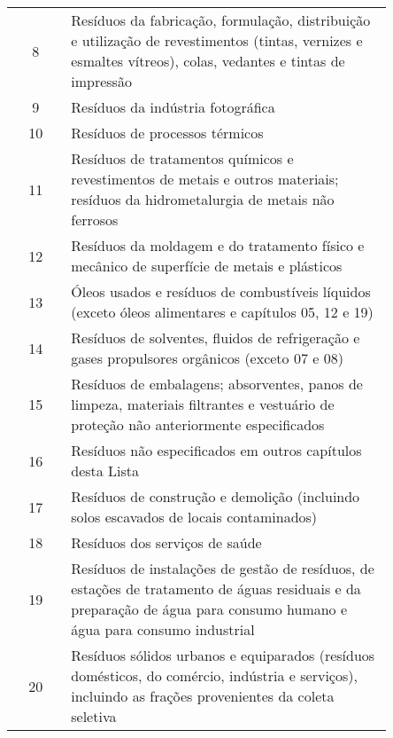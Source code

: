 \begin{table}[htb]
\begin{tabular}{@{}c C{0.85\linewidth}@{}}
        8 &
          Resíduos da fabricação, formulação, distribuição e utilização de revestimentos (tintas,  vernizes e esmaltes vítreos), colas, vedantes e tintas de impressão \\
        9                 & Resíduos da indústria fotográfica                                                                                                   \\
        10                & Resíduos de processos térmicos                                                                                                      \\
        11                & Resíduos de tratamentos químicos e revestimentos de metais e outros materiais; resíduos da hidrometalurgia de metais não ferrosos   \\
        12                & Resíduos da moldagem e do tratamento físico e mecânico de superfície de metais e plásticos                                          \\
        13                & Óleos usados e resíduos de combustíveis líquidos (exceto óleos alimentares e capítulos 05, 12 e 19)                                 \\
        14                & Resíduos de solventes, fluidos de refrigeração e gases propulsores orgânicos (exceto 07 e 08)                                       \\
        15                & Resíduos de embalagens; absorventes, panos de limpeza, materiais filtrantes e vestuário de proteção não anteriormente especificados \\
        16                & Resíduos não especificados em outros capítulos desta Lista                                                                          \\
        17                & Resíduos de construção e demolição (incluindo solos escavados de locais contaminados)                                               \\
        18                & Resíduos dos serviços de saúde                                                                                                      \\
        19 &
          Resíduos de instalações de gestão de resíduos, de estações de tratamento de águas  residuais e da preparação de água para consumo humano e água para consumo industrial \\
        20 &
          Resíduos sólidos urbanos e equiparados (resíduos domésticos, do comércio, indústria e serviços), incluindo as frações provenientes da coleta seletiva \\ \bottomrule
        \end{tabular}
    \end{table}